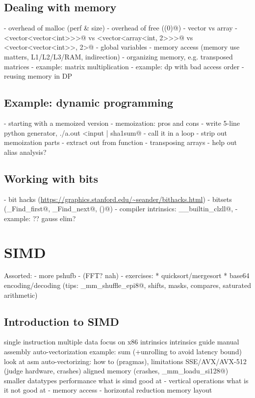 \documentclass[openany]{book}
\begin{document}
\chapter{Dealing with memory}
- overhead of malloc (perf \& size)
- overhead of free (\verb@exit(0)@)
- vector vs array
- \verb@vector<vector<vector<int>>>@ vs \verb@vector<vector<array<int, 2>>>@ vs \verb@array<vector<vector<int>>, 2>@
- global variables
- memory access (memory use matters, L1/L2/L3/RAM, indirection)
- organizing memory, e.g. transposed matrices
- example: matrix multiplication
- example: dp with bad access order
- reusing memory in DP
\chapter{Example: dynamic programming}
- starting with a memoized version
- memoization: pros and cons
- write 5-line python generator, \verb@./a.out <input | sha1sum@
- call it in a loop
- strip out memoization parts
- extract out from function
- transposing arrays
- help out alias analysis?
\chapter{Working with bits}
- bit hacks (\url{https://graphics.stanford.edu/~seander/bithacks.html})
- bitsets (\verb@_Find_first@, \verb@_Find_next@, \verb@count()@)
- compiler intrinsics: \verb@__builtin_clzll@, \verb@popcountll@
- example: ?? gauss elim?

\part{SIMD}

Assorted:
- more pshufb
- (FFT? nah)
- exercises:
 * quicksort/mergesort
 * base64 encoding/decoding (tips: \verb@_mm_shuffle_epi8@, shifts, masks, compares, saturated arithmetic)

\chapter{Introduction to SIMD}
single instruction multiple data
focus on x86
intrinsics
intrinsics guide
manual assembly
auto-vectorization
example: sum (+unrolling to avoid latency bound)
look at asm
auto-vectorizing: how to (pragmas), limitations
SSE/AVX/AVX-512 (judge hardware, crashes)
aligned memory (crashes, \verb@_mm_loadu_si128@)
smaller datatypes
performance
what is simd good at
- vertical operations
what is it not good at
- memory access
- horizontal reduction
memory layout
\end{document}
